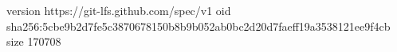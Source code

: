 version https://git-lfs.github.com/spec/v1
oid sha256:5cbe9b2d7fe5c3870678150b8b9b052ab0bc2d20d7faeff19a3538121ee9f4cb
size 170708
